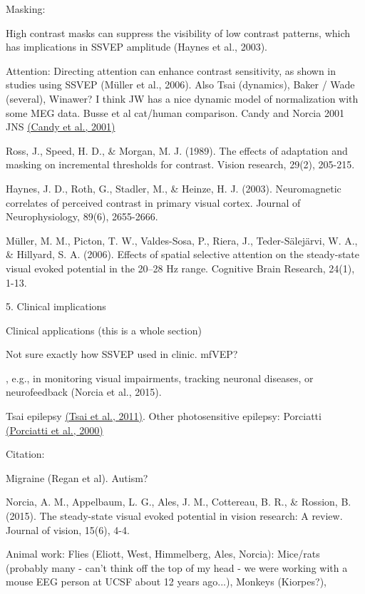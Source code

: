 \documentclass[
  letterpaper,
  DIV=11,
  numbers=noendperiod]{scrartcl}
\begin{document}
\label{anchor-8}{}Masking:

High contrast masks can suppress the visibility of low contrast
patterns, which has implications in SSVEP amplitude (Haynes et al.,
2003).

Attention: Directing attention can enhance contrast sensitivity, as
shown in studies using SSVEP (Müller et al., 2006). Also Tsai
(dynamics), Baker / Wade (several), Winawer? I think JW has a nice
dynamic model of normalization with some MEG data. Busse et al cat/human
comparison. Candy and Norcia 2001 JNS
\href{https://www.zotero.org/google-docs/?7hhs5Z}{(Candy et al., 2001)}

Ross, J., Speed, H. D., \& Morgan, M. J. (1989). The effects of
adaptation and masking on incremental thresholds for contrast. Vision
research, 29(2), 205-215.

Haynes, J. D., Roth, G., Stadler, M., \& Heinze, H. J. (2003).
Neuromagnetic correlates of perceived contrast in primary visual cortex.
Journal of Neurophysiology, 89(6), 2655-2666.

Müller, M. M., Picton, T. W., Valdes-Sosa, P., Riera, J.,
Teder-Sälejärvi, W. A., \& Hillyard, S. A. (2006). Effects of spatial
selective attention on the steady-state visual evoked potential in the
20--28 Hz range. Cognitive Brain Research, 24(1), 1-13.

5. Clinical implications

\label{anchor-9}{}Clinical applications (this is a whole
section)

Not sure exactly how SSVEP used in clinic. mfVEP?

, e.g., in monitoring visual impairments, tracking neuronal diseases, or
neurofeedback (Norcia et al., 2015).

Tsai epilepsy \href{https://www.zotero.org/google-docs/?AdhH3f}{(Tsai et
al., 2011)}. Other photosensitive epilepsy: Porciatti
\href{https://www.zotero.org/google-docs/?UTBQbV}{(Porciatti et al.,
2000)}

Citation:

Migraine (Regan et al). Autism?

Norcia, A. M., Appelbaum, L. G., Ales, J. M., Cottereau, B. R., \&
Rossion, B. (2015). The steady-state visual evoked potential in vision
research: A review. Journal of vision, 15(6), 4-4.

Animal work: Flies (Eliott, West, Himmelberg, Ales, Norcia): Mice/rats
(probably many - can't think off the top of my head - we were working
with a mouse EEG person at UCSF about 12 years ago...), Monkeys
(Kiorpes?),
\end{document}
